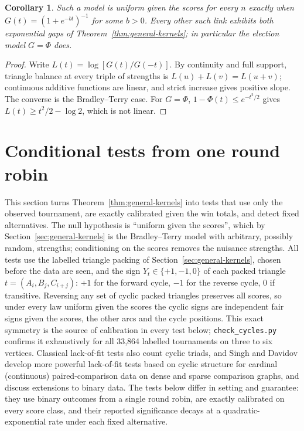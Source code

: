 \documentclass[11pt,a4paper]{article}
\newtheorem{corollary}[theorem]{Corollary}
\theoremstyle{definition}
\begin{document}
\begin{corollary}\label{thm:score-link}
Such a model is uniform given the scores for every $n$ exactly when $G(t)=(1+e^{-bt})^{-1}$ for some $b>0$. Every other such link exhibits both exponential gaps of Theorem~\ref{thm:general-kernels}; in particular the election model $G=\Phi$ does.
\end{corollary}
\begin{proof}
Write $L(t)=\log[G(t)/G(-t)]$. By continuity and full support, triangle balance at every triple of strengths is $L(u)+L(v)=L(u+v)$; continuous additive functions are linear, and strict increase gives positive slope. The converse is the Bradley--Terry case. For $G=\Phi$, $1-\Phi(t)\le e^{-t^2/2}$ gives $L(t)\ge t^2/2-\log 2$, which is not linear.
\end{proof}

\section{Conditional tests from one round robin}\label{sec:tests}

This section turns Theorem~\ref{thm:general-kernels} into tests that use only the observed tournament, are exactly calibrated given the win totals, and detect fixed alternatives. The null hypothesis is ``uniform given the scores'', which by Section~\ref{sec:general-kernels} is the Bradley--Terry model with arbitrary, possibly random, strengths; conditioning on the scores removes the nuisance strengths. All tests use the labelled triangle packing of Section~\ref{sec:general-kernels}, chosen before the data are seen, and the sign $Y_t\in\{+1,-1,0\}$ of each packed triangle $t=(A_i,B_j,C_{i+j})$: $+1$ for the forward cycle, $-1$ for the reverse cycle, $0$ if transitive. Reversing any set of cyclic packed triangles preserves all scores, so under every law uniform given the scores the cyclic signs are independent fair signs given the scores, the other arcs and the cycle positions. This exact symmetry is the source of calibration in every test below; \texttt{check\_cycles.py} confirms it exhaustively for all 33,864 labelled tournaments on three to six vertices. Classical lack-of-fit tests also count cyclic triads, and Singh and Davidov \cite{SD2026} develop more powerful lack-of-fit tests based on cyclic structure for cardinal (continuous) paired-comparison data on dense and sparse comparison graphs, and discuss extensions to binary data. The tests below differ in setting and guarantee: they use binary outcomes from a single round robin, are exactly calibrated on every score class, and their reported significance decays at a quadratic-exponential rate under each fixed alternative.
\end{document}

